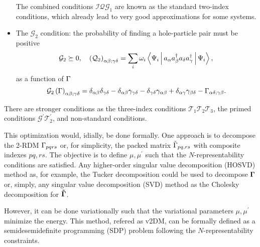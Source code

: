 \begin{itemize}
        The combined conditions $\mathcal{IQG}_1$ are known as the standard
        two-index conditions, which already lead to very good approximations
        for some systems.

    \item The $\mathcal{G}_2$ condition: the probability of finding a 
        hole-particle pair must be positive
        \begin{equation}
            \mathcal{G}_2 \succeq 0, \quad
            \left( \mathcal{Q}_2 \right)_{\alpha \beta;\gamma \delta} =
            \sum_{i} \omega_i 
            \Braket{\Psi_i | a_{\alpha} a_{\beta}^{\dagger} 
            a_{\delta} a_{\gamma}^{\dagger} | \Psi_i},
        \end{equation}
        as a function of $\Gamma$
        \begin{equation}
            \mathcal{G}_2\left( \Gamma \right)_{\alpha\beta;\gamma\delta} =
            \delta_{\alpha \beta } \delta_{\gamma \delta} - 
            \delta_{\alpha \beta } \gamma_{\gamma \delta} - 
            \delta_{\gamma \delta } \gamma_{\alpha \beta} +
            \delta_{\alpha \gamma } \gamma_{\beta \delta} -
            \Gamma_{\alpha \delta ; \gamma \beta}
            .
        \end{equation}
\end{itemize}

There are stronger conditions as the three-index conditions $\mathcal{T}_1 \mathcal{T}_2 \mathcal{T}_3$,
the primed conditions
$\mathcal{G^{\prime}} \mathcal{T}_2^{\prime}$, and non-standard conditions.


This optimization would, idially, be done formally.
One approach is to decompose the 2-RDM $\Gamma_{pqrs}$ or, for simplicity, the
packed matrix $\tilde{\Gamma}_{pq,rs}$ with composite indexes $pq, rs$.
The objective is to define $\mu, \mu^{\prime}$ such that the $N$-representability
conditions are satisfied.
Any higher-order singular value decomposition (HOSVD) method as, for example,
the Tucker decomposition
could be used to decompose $\boldsymbol{\mathrm{\Gamma}}$
or, simply, any singular value decomposition (SVD) method as the Cholesky
decomposition for $\boldsymbol{\mathrm{\tilde{\Gamma}}}$.

However, it can be done variationally such that the variational parameters
$\mu,\mu^{\prime}$ minimize the energy.
This method, refered as v2DM, can be formally defined as a semidesemidefinite
programming (SDP) problem following the $N$-representability 
constraints.

